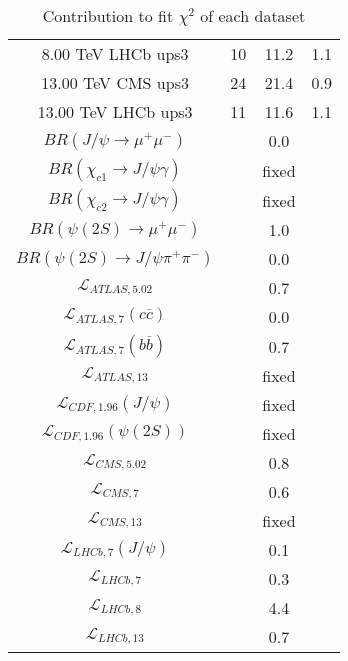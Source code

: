 \begin{table}[h!]
\begin{tabular}{c|c|c|c}
8.00 TeV LHCb ups3 & 10 & 11.2 & 1.1 \\
13.00 TeV CMS ups3 & 24 & 21.4 & 0.9 \\
13.00 TeV LHCb ups3 & 11 & 11.6 & 1.1 \\
\hline
$BR(J/\psi\rightarrow\mu^+\mu^-)$ &  & 0.0 &  \\
$BR(\chi_{c1}\rightarrow J/\psi\gamma)$ &  & fixed & \\
$BR(\chi_{c2}\rightarrow J/\psi\gamma)$ &  & fixed & \\
$BR(\psi(2S)\rightarrow\mu^+\mu^-)$ &  & 1.0 &  \\
$BR(\psi(2S)\rightarrow J/\psi\pi^+\pi^-)$ &  & 0.0 &  \\
$\mathcal L_{ATLAS,5.02}$ &  & 0.7 &  \\
$\mathcal L_{ATLAS,7}(c\overline c)$ &  & 0.0 &  \\
$\mathcal L_{ATLAS,7}(b\overline b)$ &  & 0.7 &  \\
$\mathcal L_{ATLAS,13}$ &  & fixed & \\
$\mathcal L_{CDF,1.96}(J/\psi)$ &  & fixed & \\
$\mathcal L_{CDF,1.96}(\psi(2S))$ &  & fixed & \\
$\mathcal L_{CMS,5.02}$ &  & 0.8 &  \\
$\mathcal L_{CMS,7}$ &  & 0.6 &  \\
$\mathcal L_{CMS,13}$ &  & fixed & \\
$\mathcal L_{LHCb,7}(J/\psi)$ &  & 0.1 &  \\
$\mathcal L_{LHCb,7}$ &  & 0.3 &  \\
$\mathcal L_{LHCb,8}$ &  & 4.4 &  \\
$\mathcal L_{LHCb,13}$ &  & 0.7 &  \\
\end{tabular}
\caption{Contribution to fit $\chi^2$ of each dataset}
\end{table}
